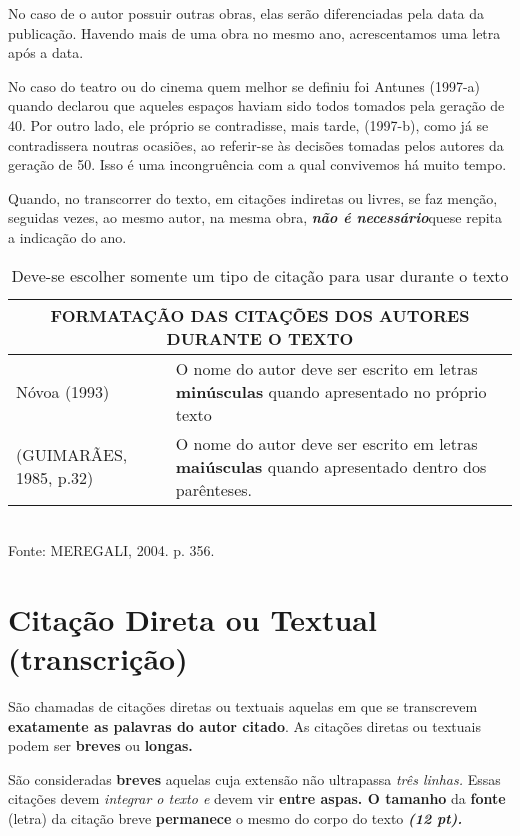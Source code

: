 \documentclass[rel_mlp]{iiufrgs}
\begin{document}
No caso de o autor possuir outras obras, elas serão diferenciadas pela data da publicação. Havendo mais de uma obra no mesmo ano, acrescentamos uma letra após a data.

No caso do teatro ou do cinema quem melhor se definiu foi Antunes (1997-a) quando declarou que aqueles espaços haviam sido todos tomados pela geração de 40. Por outro lado, ele próprio se contradisse, mais tarde, (1997-b), como já se contradissera noutras ocasiões, ao referir-se às decisões tomadas pelos autores da geração de 50. Isso é uma incongruência com a qual convivemos há muito tempo.

Quando, no transcorrer do texto, em citações indiretas ou livres, se faz menção, seguidas vezes, ao mesmo autor, na mesma obra, {\bf {\it não é necessário}}{\it  }que{\it  }se repita a indicação do ano.


\begin{table}[ht]
  \caption{Deve-se escolher somente um tipo de citação para usar durante o texto}
  \centering
    \begin{tabular}{ l | p{8cm} }
        \hline
        \multicolumn{2}{c}{FORMATAÇÃO DAS CITAÇÕES DOS AUTORES DURANTE O TEXTO} \\
        \hline
        Nóvoa (1993) & O nome do autor deve ser escrito em letras {\bf minúsculas }quando apresentado no próprio texto \\
        \hline
        (GUIMARÃES, 1985, p.32) & O nome do autor deve ser escrito em letras {\bf maiúsculas }quando apresentado dentro dos parênteses. \\
      \hline
    \end{tabular}
  \\Fonte: MEREGALI, 2004. p. 356.
  \label{tab:tabela3}
\end{table}



\section{Citação Direta ou Textual (transcrição)}

São chamadas de citações diretas ou textuais aquelas em que se transcrevem {\bf exatamente as palavras do autor citado}. As citações diretas ou textuais podem ser {\bf breves }ou {\bf longas.}

São consideradas {\bf breves} aquelas cuja extensão não ultrapassa {\it três linhas. }Essas citações devem {\it integrar o texto e }devem vir {\bf entre aspas. O tamanho }da {\bf fonte }(letra) da citação breve {\bf permanece }o mesmo do corpo do texto {\bf {\it (12 pt).}}
\end{document}
